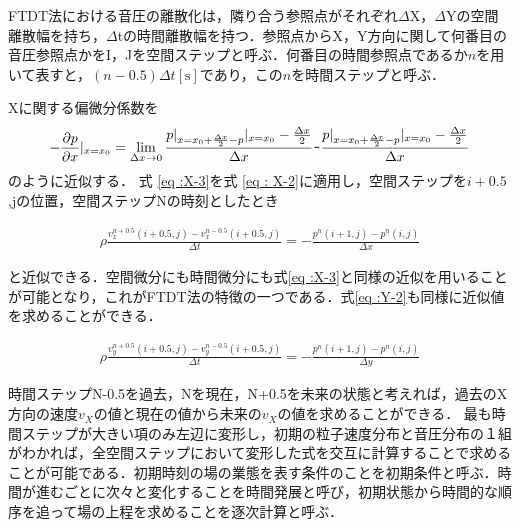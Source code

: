 \documentclass[a4j,12pt]{jsarticle}
\begin{document}
FTDT法における音圧の離散化は，隣り合う参照点がそれぞれ$\Delta$X，$\Delta$Yの空間離散幅を持ち，$\Delta$tの時間離散幅を持つ．参照点からX，Y方向に関して何番目の音圧参照点かをI，Jを空間ステップと呼ぶ．何番目の時間参照点であるか$n$を用いて表すと，$(n-0.5)\Delta t\mathrm{[s]}$であり，この$n$を時間ステップと呼ぶ．

Xに関する偏微分係数を
\begin {eqnarray}
\label{eq :X-3}
- \frac { \partial p }{ \partial x }|_{ x=x_0} = \lim_{\Delta x \to 0} \frac{p|_{x=x_0+ \frac {\Delta x}{2} -p}| _{x=x_0} - \frac{ \Delta x}{2} }{ \Delta x} \verb|~| \frac{p|_{x=x_0+ \frac {\Delta x}{2} -p}| _{x=x_0} - \frac{ \Delta x}{2} }{ \Delta x}
\end{eqnarray}
のように近似する．
式 \ref{eq :X-3}を式 \ref{eq : X-2}に適用し，空間ステップを$i+0.5$,jの位置，空間ステップNの時刻としたとき

\begin {eqnarray}
\label{eq:X-4}
\rho \frac{ v_x^{n+0.5}( i+0.5, j ) -v_x^{ n-0.5 }( i+0.5,j ) }{ \Delta t } = - \frac{ p^n( i+1 ,j ) -p^n( i,j ) }{ \Delta x }
\end{eqnarray}

と近似できる．空間微分にも時間微分にも式\ref{eq :X-3}と同様の近似を用いることが可能となり，これがFTDT法の特徴の一つである．式\ref{eq :Y-2}も同様に近似値を求めることができる．

\begin {eqnarray}
\label{eq:Y-4}
\rho \frac{ v_y^{n+0.5}( i+0.5, j ) -v_y^{ n-0.5 }( i+0.5,j ) }{ \Delta t } = - \frac{ p^n( i+1 ,j ) -p^n( i,j ) }{ \Delta y }
\end{eqnarray}


時間ステップN-0.5を過去，Nを現在，N+0.5を未来の状態と考えれば，過去のX方向の速度$v_X$の値と現在の値から未来の$v_X$の値を求めることができる．
最も時間ステップが大きい項のみ左辺に変形し，初期の粒子速度分布と音圧分布の１組がわかれば，全空間ステップにおいて変形した式を交互に計算することで求めることが可能である．初期時刻の場の業態を表す条件のことを初期条件と呼ぶ．時間が進むごとに次々と変化することを時間発展と呼び，初期状態から時間的な順序を追って場の上程を求めることを逐次計算と呼ぶ．
\end{document}
